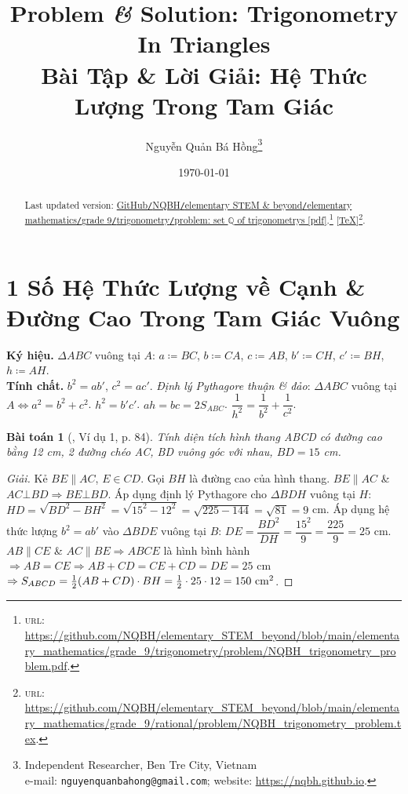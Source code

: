 \documentclass{article}
\title{Problem {\it\&} Solution: Trigonometry In Triangles\\Bài Tập \& Lời Giải: Hệ Thức Lượng Trong Tam Giác}
\author{Nguyễn Quản Bá Hồng\footnote{Independent Researcher, Ben Tre City, Vietnam\\e-mail: \texttt{nguyenquanbahong@gmail.com}; website: \url{https://nqbh.github.io}.}}
\date{\today}
\newtheorem{baitoan}{Bài toán}
\begin{document}
\maketitle
\begin{abstract}
	Last updated version: \href{https://github.com/NQBH/elementary_STEM_beyond/blob/main/elementary_mathematics/grade_9/trigonometry/problem/NQBH_trigonometry_problem.pdf}{GitHub{\tt/}NQBH{\tt/}elementary STEM \& beyond{\tt/}elementary mathematics{\tt/}grade 9{\tt/}trigonometry{\tt/}problem: set $\mathbb{Q}$ of trigonometrys [pdf]}.\footnote{\textsc{url}: \url{https://github.com/NQBH/elementary_STEM_beyond/blob/main/elementary_mathematics/grade_9/trigonometry/problem/NQBH_trigonometry_problem.pdf}.} [\href{https://github.com/NQBH/elementary_STEM_beyond/blob/main/elementary_mathematics/grade_9/trigonometry/problem/NQBH_trigonometry_problem.tex}{\TeX}]\footnote{\textsc{url}: \url{https://github.com/NQBH/elementary_STEM_beyond/blob/main/elementary_mathematics/grade_9/rational/problem/NQBH_trigonometry_problem.tex}.}. 
\end{abstract}
\tableofcontents


\section{1 Số Hệ Thức Lượng về Cạnh \& Đường Cao Trong Tam Giác Vuông}
\textbf{\textsf{Ký hiệu.}} $\Delta ABC$ vuông tại $A$: $a\coloneqq BC$, $b\coloneqq CA$, $c\coloneqq AB$, $b'\coloneqq CH$, $c'\coloneqq BH$, $h\coloneqq AH$.\\\textbf{\textsf{Tính chất.}}  $b^2 = ab'$, $c^2 = ac'$.  \textit{Định lý Pythagore thuận \& đảo}: $\Delta ABC$ vuông tại $A\Leftrightarrow a^2 = b^2 + c^2$.  $h^2 = b'c'$.  $ah = bc = 2S_{ABC}$.  $\dfrac{1}{h^2} = \dfrac{1}{b^2} + \dfrac{1}{c^2}$.

\begin{baitoan}[\cite{Binh_Toan_9_tap_1}, Ví dụ 1, p. 84]
	Tính diện tích hình thang ABCD có đường cao bằng {\rm12 cm}, 2 đường chéo AC, BD vuông góc với nhau, $BD = 15$ {\rm cm}.
\end{baitoan}

\begin{proof}[Giải]
	Kẻ $BE\parallel AC$, $E\in CD$. Gọi $BH$ là đường cao của hình thang. $BE\parallel AC$ \& $AC\bot BD\Rightarrow BE\bot BD$. Áp dụng định lý Pythagore cho $\Delta BDH$ vuông tại $H$: $HD = \sqrt{BD^2 - BH^2} = \sqrt{15^2 - 12^2} = \sqrt{225 - 144} = \sqrt{81} = 9$ cm. Áp dụng hệ thức lượng $b^2 = ab'$ vào $\Delta BDE$ vuông tại $B$: $DE = \dfrac{BD^2}{DH} = \dfrac{15^2}{9} = \dfrac{225}{9} = 25$ cm. $AB\parallel CE$ \& $AC\parallel BE\Rightarrow ABCE$ là hình bình hành $\Rightarrow AB = CE\Rightarrow AB + CD = CE + CD = DE = 25$ cm $\Rightarrow S_{ABCD} = \frac{1}{2}(AB + CD)\cdot BH = \frac{1}{2}\cdot25\cdot12 = 150\ {\rm cm}^2$.
\end{proof}
\end{document}

